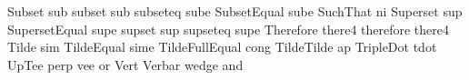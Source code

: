  Subset                          sub
 subset                          sub
 subseteq                        sube
 SubsetEqual                     sube
 SuchThat                        ni
 Superset                        sup
 SupersetEqual                   supe
 supset                          sup
 supseteq                        supe
 Therefore                       there4
 therefore                       there4
 Tilde                           sim
 TildeEqual                      sime
 TildeFullEqual                  cong
 TildeTilde                      ap
 TripleDot                       tdot
 UpTee                           perp
 vee                             or
 Vert                            Verbar
 wedge                           and

